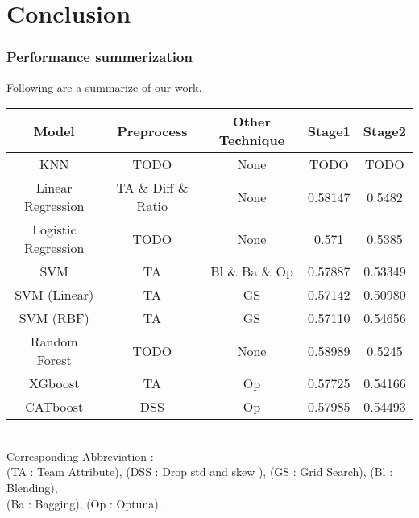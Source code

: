 \section{Conclusion}
\subsubsection*{Performance summerization}
Following are a summarize of our work.
\begin{table}[h]
    \centering
    \begin{tabular}{|c|c|c|c|c|}
    \hline
    Model & Preprocess & Other Technique & Stage1 & Stage2 \\ \hline\hline
    KNN   & TODO   & None & TODO & TODO  \\ \hline
    Linear Regression & TA \& Diff \& Ratio & None & 0.58147 & 0.5482 \\ \hline
    Logistic Regression & TODO & None & 0.571 & 0.5385 \\ \hline
    SVM & TA & Bl \& Ba \& Op & 0.57887 & 0.53349 \\ \hline
    SVM (Linear) & TA & GS & 0.57142 & 0.50980 \\ \hline
    SVM (RBF) & TA & GS & 0.57110 & 0.54656 \\ \hline
    Random Forest & TODO & None & 0.58989 & 0.5245 \\ \hline
    XGboost & TA & Op & 0.57725 & 0.54166 \\ \hline
    CATboost & DSS & Op & 0.57985 & 0.54493 \\ \hline
    \end{tabular}
    \label{tab:example_table}
\end{table}\\
Corresponding Abbreviation : \\
(TA : Team Attribute), (DSS : Drop std and skew ), (GS : Grid Search), (Bl : Blending),\\
 (Ba : Bagging), (Op : Optuna).

